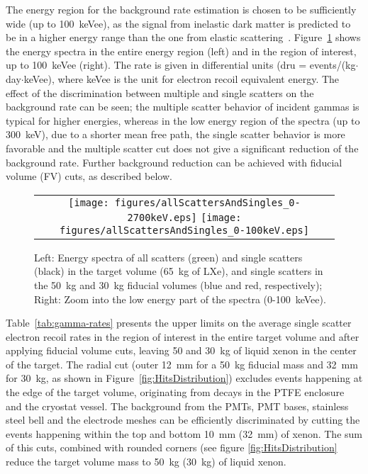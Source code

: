 The energy region for the background rate estimation is chosen
to be sufficiently wide (up to 100~keVee), as the signal from inelastic dark matter is predicted to be 
in a higher energy range than the one from elastic scattering~\cite{inelastic}. Figure~\ref{fig:Spectra} shows the energy spectra in the entire energy region
(left) and in the region of interest, up to 100~keVee (right). The rate is given in differential units (dru = events/(kg$\cdot$day$\cdot$keVee), where
keVee is the unit for electron recoil equivalent energy. The effect of the discrimination 
between multiple and single scatters on the background rate 
can be seen; the multiple scatter behavior of incident gammas is 
typical for higher energies, whereas in the low energy region of the spectra (up to 300~keV), due to a shorter mean free path, 
the single scatter behavior is more favorable and the multiple scatter cut does not give a significant reduction of the background rate. Further background 
reduction can be achieved with fiducial volume (FV) cuts, as described below.

\begin{figure}[t!]
\begin{center}
\begin{tabular}{c}
 \texttt{[image: figures/allScattersAndSingles\_0-2700keV.eps]}
 \texttt{[image: figures/allScattersAndSingles\_0-100keV.eps]}
\end{tabular}
\caption{Left: Energy spectra of all scatters (green) and single scatters
  (black) in the target volume (65~kg of LXe), and single scatters in the 
50~kg and 30~kg fiducial volumes (blue and red, respectively);  Right: Zoom into the low energy part of the spectra (0-100~keVee).}
\label{fig:Spectra}
\end{center}
\end{figure}

Table~\ref{tab:gamma-rates} presents the upper limits on the average single scatter electron recoil rates
in the region of interest in the entire 
target volume and after applying fiducial volume cuts, leaving 50 and 30~kg of
liquid xenon in the center of the target.
The radial cut (outer 12~mm for a  50~kg fiducial mass and 32~mm for 30~kg, as shown in Figure~\ref{fig:HitsDistribution}) excludes events happening at the edge of 
the target volume, originating from decays in the PTFE enclosure and the
cryostat vessel.
The background from the PMTs, PMT bases, stainless steel bell and the electrode meshes can 
be efficiently discriminated by cutting the events happening within the top
and bottom 10~mm (32~mm) of xenon. 
The sum of this cuts, combined with rounded corners (see figure \ref{fig:HitsDistribution} reduce the target volume mass to 50~kg (30~kg) of liquid xenon.

